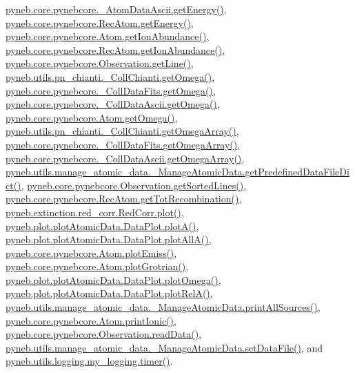 \hyperlink{pynebcore_8py_source_l00537}{pyneb.\-core.\-pynebcore.\-\_\-\-Atom\-Data\-Ascii.\-get\-Energy()}, \hyperlink{pynebcore_8py_source_l02927}{pyneb.\-core.\-pynebcore.\-Rec\-Atom.\-get\-Energy()}, \hyperlink{pynebcore_8py_source_l02176}{pyneb.\-core.\-pynebcore.\-Atom.\-get\-Ion\-Abundance()}, \hyperlink{pynebcore_8py_source_l03083}{pyneb.\-core.\-pynebcore.\-Rec\-Atom.\-get\-Ion\-Abundance()}, \hyperlink{pynebcore_8py_source_l03665}{pyneb.\-core.\-pynebcore.\-Observation.\-get\-Line()}, \hyperlink{pn__chianti_8py_source_l00507}{pyneb.\-utils.\-pn\-\_\-chianti.\-\_\-\-Coll\-Chianti.\-get\-Omega()}, \hyperlink{pynebcore_8py_source_l00828}{pyneb.\-core.\-pynebcore.\-\_\-\-Coll\-Data\-Fits.\-get\-Omega()}, \hyperlink{pynebcore_8py_source_l01082}{pyneb.\-core.\-pynebcore.\-\_\-\-Coll\-Data\-Ascii.\-get\-Omega()}, \hyperlink{pynebcore_8py_source_l01324}{pyneb.\-core.\-pynebcore.\-Atom.\-get\-Omega()}, \hyperlink{pn__chianti_8py_source_l00484}{pyneb.\-utils.\-pn\-\_\-chianti.\-\_\-\-Coll\-Chianti.\-get\-Omega\-Array()}, \hyperlink{pynebcore_8py_source_l00800}{pyneb.\-core.\-pynebcore.\-\_\-\-Coll\-Data\-Fits.\-get\-Omega\-Array()}, \hyperlink{pynebcore_8py_source_l01058}{pyneb.\-core.\-pynebcore.\-\_\-\-Coll\-Data\-Ascii.\-get\-Omega\-Array()}, \hyperlink{manage__atomic__data_8py_source_l00034}{pyneb.\-utils.\-manage\-\_\-atomic\-\_\-data.\-\_\-\-Manage\-Atomic\-Data.\-get\-Predefined\-Data\-File\-Dict()}, \hyperlink{pynebcore_8py_source_l03684}{pyneb.\-core.\-pynebcore.\-Observation.\-get\-Sorted\-Lines()}, \hyperlink{pynebcore_8py_source_l02851}{pyneb.\-core.\-pynebcore.\-Rec\-Atom.\-get\-Tot\-Recombination()}, \hyperlink{red__corr_8py_source_l00303}{pyneb.\-extinction.\-red\-\_\-corr.\-Red\-Corr.\-plot()}, \hyperlink{plot_atomic_data_8py_source_l00117}{pyneb.\-plot.\-plot\-Atomic\-Data.\-Data\-Plot.\-plot\-A()}, \hyperlink{plot_atomic_data_8py_source_l00189}{pyneb.\-plot.\-plot\-Atomic\-Data.\-Data\-Plot.\-plot\-All\-A()}, \hyperlink{pynebcore_8py_source_l02384}{pyneb.\-core.\-pynebcore.\-Atom.\-plot\-Emiss()}, \hyperlink{pynebcore_8py_source_l02443}{pyneb.\-core.\-pynebcore.\-Atom.\-plot\-Grotrian()}, \hyperlink{plot_atomic_data_8py_source_l00373}{pyneb.\-plot.\-plot\-Atomic\-Data.\-Data\-Plot.\-plot\-Omega()}, \hyperlink{plot_atomic_data_8py_source_l00262}{pyneb.\-plot.\-plot\-Atomic\-Data.\-Data\-Plot.\-plot\-Rel\-A()}, \hyperlink{manage__atomic__data_8py_source_l00431}{pyneb.\-utils.\-manage\-\_\-atomic\-\_\-data.\-\_\-\-Manage\-Atomic\-Data.\-print\-All\-Sources()}, \hyperlink{pynebcore_8py_source_l02233}{pyneb.\-core.\-pynebcore.\-Atom.\-print\-Ionic()}, \hyperlink{pynebcore_8py_source_l03711}{pyneb.\-core.\-pynebcore.\-Observation.\-read\-Data()}, \hyperlink{manage__atomic__data_8py_source_l00380}{pyneb.\-utils.\-manage\-\_\-atomic\-\_\-data.\-\_\-\-Manage\-Atomic\-Data.\-set\-Data\-File()}, and \hyperlink{logging_8py_source_l00115}{pyneb.\-utils.\-logging.\-my\-\_\-logging.\-timer()}.

